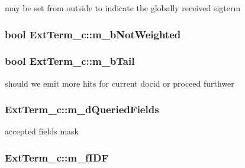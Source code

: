 may be set from outside to indicate the globally received sigterm 

\hypertarget{classExtTerm__c_a353e10217afc66de607587ecc1571a54}{
\subsubsection[{m\-\_\-b\-Not\-Weighted}]{\setlength{\rightskip}{0pt plus 5cm}bool Ext\-Term\-\_\-c\-::m\-\_\-b\-Not\-Weighted\hspace{0.3cm}{\ttfamily [protected]}}}\label{classExtTerm__c_a353e10217afc66de607587ecc1571a54}
\hypertarget{classExtTerm__c_a5be35957c870d9734477590b9f4ff08b}{
\subsubsection[{m\-\_\-b\-Tail}]{\setlength{\rightskip}{0pt plus 5cm}bool Ext\-Term\-\_\-c\-::m\-\_\-b\-Tail\hspace{0.3cm}{\ttfamily [protected]}}}\label{classExtTerm__c_a5be35957c870d9734477590b9f4ff08b}


should we emit more hits for current docid or proceed furthwer 

\hypertarget{classExtTerm__c_a124e40beb7a432f1b9ed806bcc4317b5}{
\subsubsection[{m\-\_\-d\-Queried\-Fields}]{ Ext\-Term\-\_\-c\-::m\-\_\-d\-Queried\-Fields\hspace{0.3cm}{\ttfamily [protected]}}}\label{classExtTerm__c_a124e40beb7a432f1b9ed806bcc4317b5}


accepted fields mask 

\hypertarget{classExtTerm__c_a61708a232afef18165f8696a03d92583}{
\subsubsection[{m\-\_\-f\-I\-D\-F}]{ Ext\-Term\-\_\-c\-::m\-\_\-f\-I\-D\-F\hspace{0.3cm}{\ttfamily [protected]}}}\label{classExtTerm__c_a61708a232afef18165f8696a03d92583}


